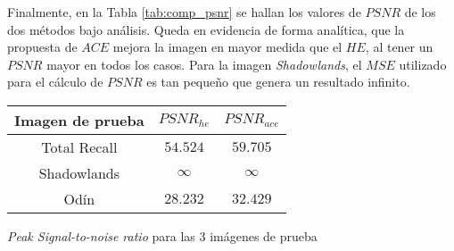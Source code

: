 Finalmente, en la Tabla \ref{tab:comp_psnr} se hallan los valores de $PSNR$ de
los dos métodos bajo análisis. Queda en evidencia de forma analítica, que
la propuesta de $ACE$ mejora la imagen en mayor medida que el $HE$, al tener un
$PSNR$ mayor en todos los casos. Para la imagen \emph{Shadowlands}, el $MSE$
utilizado para el cálculo de $PSNR$ es tan pequeño que genera un resultado infinito.\\

\noindent
\begin{minipage}{\columnwidth}
	\makeatletter
	\newcommand{\@captype}{table}
	\centering
	\begin{tabular}{@{}ccc@{}}
		\toprule
		Imagen de prueba& ${PSNR}_{he}$ & ${PSNR}_{ace}$ \\
		\midrule
		Total Recall	& $54.524$      & $59.705$       \\
		Shadowlands  	& $\infty$      & $\infty$       \\
		Odín         	& $28.232$      & $32.429$		 \\
		\bottomrule
	\end{tabular}
	\caption{\emph{Peak Signal-to-noise ratio} para las 3 imágenes de prueba}
	\label{tab:comp_psnr}
\end{minipage}

